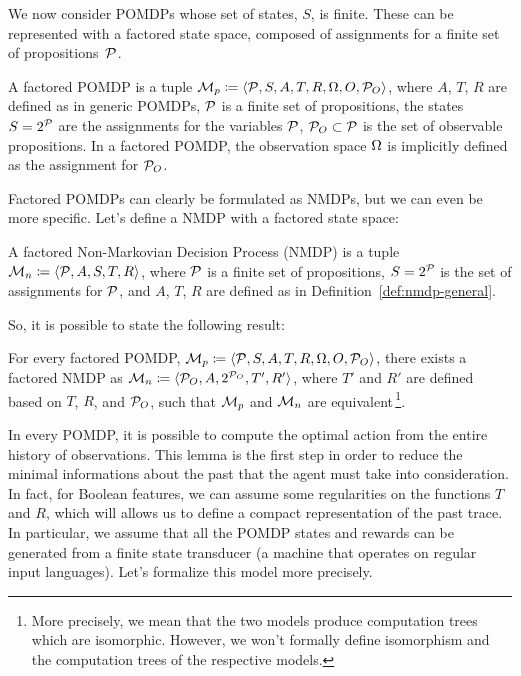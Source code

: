 We now consider POMDPs whose set of states, $S$, is finite. These can be
represented with a factored state space, composed of assignments for a finite
set of propositions~$\mathcal{P}$.
\begin{definition}
	A factored POMDP is a tuple $\mathcal{M}_p \coloneqq \langle \mathcal{P}, S, A,
	T, R, \Omega, O, \mathcal{P}_O \rangle$, where $A$, $T$, $R$ are defined as in
	generic POMDPs, $\mathcal{P}$ is a finite set of propositions, the states $S
	= 2^{\mathcal{P}}$ are the assignments for the variables $\mathcal{P}$,
	$\mathcal{P}_O \subset \mathcal{P}$ is the set of observable propositions. In
	a factored POMDP, the observation space $\Omega$ is implicitly defined as the
	assignment for $\mathcal{P}_O$.
\end{definition}

Factored POMDPs can clearly be formulated as NMDPs, but we can even be more
specific. Let's define a NMDP with a factored state space:
\begin{definition}
	A factored Non-Markovian Decision Process (NMDP) is a tuple $\mathcal{M}_n
	\coloneqq \langle \mathcal{P}, A, S, T, R \rangle$, where $\mathcal{P}$ is a
	finite set of propositions, $S = 2^{\mathcal{P}}$ is the set of assignments for
	$\mathcal{P}$, and $A$, $T$, $R$ are defined as in
	Definition~\ref{def:nmdp-general}.
	\label{def:nmdp-factored}
\end{definition}
So, it is possible to state the following result:
\begin{lemma}
	\cite{bib:rdp} For every factored POMDP, $\mathcal{M}_p \coloneqq \langle
	\mathcal{P}, S, A, T, R, \Omega, O, \mathcal{P}_O \rangle$, there exists a
	factored NMDP as $\mathcal{M}_n \coloneqq \langle \mathcal{P}_O, A,
	2^{\mathcal{P}_O}, T', R' \rangle$, where $T'$ and $R'$ are defined based on
	$T$, $R$, and $\mathcal{P}_O$, such that $\mathcal{M}_p$ and $\mathcal{M}_n$ are
	equivalent\,\footnote{More precisely, we mean that the two models produce
	computation trees which are isomorphic. However, we won't formally define
	isomorphism and the computation trees of the respective models.}.
\end{lemma}

In every POMDP, it is possible to compute the optimal action from the entire
history of observations. This lemma is the first step in order to reduce the
minimal informations about the past that the agent must take into
consideration. In fact, for Boolean features, we can assume some regularities
on the functions $T$ and $R$, which will allows us to define a compact
representation of the past trace. In particular, we assume that all the POMDP
states and rewards can be generated from a finite state transducer (a machine
that operates on regular input languages). Let's formalize this model more
precisely.

